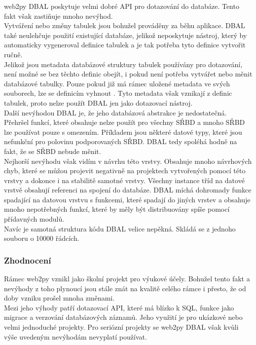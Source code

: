 \documentclass[ing,male,java,dept456]{diploma}						%
\begin{document}
web2py DBAL poskytuje velmi dobré API pro dotazování do databáze. Tento fakt však zastiňuje mnoho nevýhod. \\
Vytváření nebo změny tabulek jsou bohužel prováděny za běhu aplikace. DBAL také neulehčuje použití existující databáze, jelikož neposkytuje nástroj, který by automaticky vygeneroval definice tabulek a je tak potřeba tyto definice vytvořit ručně. \\
Jelikož jsou metadata databázové struktury tabulek používány pro dotazování, není možné se bez těchto definic obejít, i pokud není potřeba vytvářet nebo měnit databázové tabulky. Pouze pokud již má rámec uložené metadata ve svých souborech, lze se definicím vyhnout \cite{web2py-dal}. Tyto metadata však vznikají z definic tabulek, proto nelze použít DBAL jen jako dotazovací nástroj. \\
Další nevýhodou DBAL je, že jeho databázová abstrakce je nedostatečná. Přehršel funkcí, které obsahuje nelze použít pro všechny SŘBD a mnoho SŘBD lze používat pouze s omezením. Příkladem jsou některé datové typy, které jsou nefunkční pro polovinu podporovaných SŘBD. DBAL tedy spoléhá hodně na fakt, že se SŘBD nebude měnit. \\
Nejhorší nevýhodu však vidím v návrhu této vrstvy. Obsahuje mnoho návrhových chyb, které se můžou projevit negativně na projektech vytvořených pomocí této vrstvy a dokonce i na stabilitě samotné vrstvy. Všechny instance tříd na datové vrstvě obsahují referenci na spojení do databáze. DBAL míchá dohromady funkce spadající na datovou vrstvu s funkcemi, které spadají do jiných vrstev a obsahuje mnoho nepotřebných funkcí, které by měly být distribuovány spíše pomocí přídavných modulů. \\
Navíc je samotná struktura kódu DBAL velice nepěkná. Skládá se z jednoho souboru o 10000 řádcích.

\subsubsection{Zhodnocení}

Rámec web2py vznikl jako školní projekt pro výukové účely. Bohužel tento fakt a nevýhody z toho plynoucí jsou stále znát na kvalitě celého rámce i přesto, že od doby vzniku prošel mnoha změnami. \\
Mezi jeho výhody patří dotazovací API, které má blízko k SQL, funkce jako migrace a verzování databázových záznamů. Jeho využití je pro ukázkové nebo velmi jednoduché projekty. Pro seriózní projekty se web2py DBAL však kvůli výše uvedeným nevýhodám nevyplatí používat. 
\end{document}
